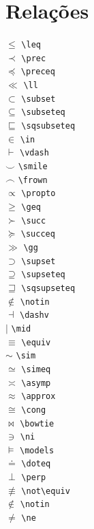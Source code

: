 \documentclass{fei}
\begin{document}
\section{Relações}
\begin{multicols}{3}
\noindent
\(\leq\) \verb+\leq+\\
\(\prec\) \verb+\prec+\\
\(\preceq\) \verb+\preceq+\\
\(\ll\) \verb+\ll+\\
\(\subset\) \verb+\subset+\\
\(\subseteq\) \verb+\subseteq+\\
\(\sqsubseteq\) \verb+\sqsubseteq+\\
\(\in\) \verb+\in+\\
\(\vdash\) \verb+\vdash+\\
\(\smile\) \verb+\smile+\\
\(\frown\) \verb+\frown+\\
\(\propto\) \verb+\propto+\\
\(\geq\) \verb+\geq+\\
\(\succ\) \verb+\succ+\\
\(\succeq\) \verb+\succeq+\\
\(\gg\) \verb+\gg+\\
\(\supset\) \verb+\supset+\\
\(\supseteq\) \verb+\supseteq+\\
\(\sqsupseteq\) \verb+\sqsupseteq+\\
\(\notin\) \verb+\notin+\\
\(\dashv\) \verb+\dashv+\\
\(\mid\) \verb+\mid+\\
\(\equiv\) \verb+\equiv+\\
\(\sim\) \verb+\sim+\\
\(\simeq\) \verb+\simeq+\\
\(\asymp\) \verb+\asymp+\\
\(\approx\) \verb+\approx+\\
\(\cong\) \verb+\cong+\\
\(\bowtie\) \verb+\bowtie+\\
\(\ni\) \verb+\ni+\\
\(\models\) \verb+\models+\\
\(\doteq\) \verb+\doteq+\\
\(\perp\) \verb+\perp+\\
\(\not\equiv\) \verb+\not\equiv+\\
\(\notin\) \verb+\notin+\\
\(\ne\) \verb+\ne+\\
\end{multicols}
\end{document}
